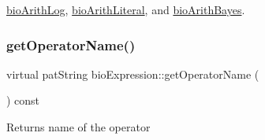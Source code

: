 \hyperlink{classbio_arith_log_a875351accd5a515a1d3452dea45a354d}{bio\+Arith\+Log}, \hyperlink{classbio_arith_literal_acce01225d50f0ba0a263b2fbaa71b79b}{bio\+Arith\+Literal}, and \hyperlink{classbio_arith_bayes_a3421312ddc6b7e0b080c497cdc53d1a5}{bio\+Arith\+Bayes}.

\mbox{\label{classbio_expression_a2353a4afb3a2b0af7c63aba086a72bde}} 
\subsubsection{\texorpdfstring{get\+Operator\+Name()}{getOperatorName()}}
{\footnotesize\ttfamily virtual pat\+String bio\+Expression\+::get\+Operator\+Name (\begin{DoxyParamCaption}{ }\end{DoxyParamCaption}) const\hspace{0.3cm}{\ttfamily [virtual]}}

\begin{DoxyReturn}{Returns}
name of the operator 
\end{DoxyReturn}


